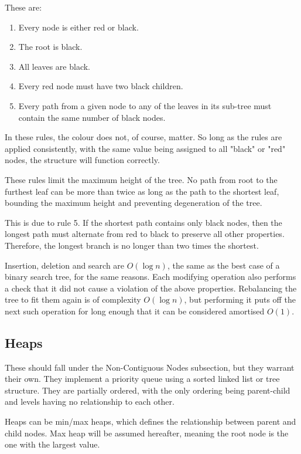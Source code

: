 \documentclass[]{article}
\begin{document}
These are:

\begin{enumerate}
	\item Every node is either red or black.
	\item The root is black.
	\item All leaves are black. 
	\item Every red node must have two black children.
	\item Every path from a given node to any of the leaves in its sub-tree must contain the same number of black nodes.
\end{enumerate}

In these rules, the colour does not, of course, matter. So long as the rules are applied consistently, with the same value being assigned to all "black" or "red" nodes, the structure will function correctly.

These rules limit the maximum height of the tree. No path from root to the furthest leaf can be more than twice as long as the path to the shortest leaf, bounding the maximum height and preventing degeneration of the tree.

This is due to rule 5. If the shortest path contains only black nodes, then the longest path must alternate from red to black to preserve all other properties. Therefore, the longest branch is no longer than two times the shortest.

Insertion, deletion and search are $O(\log{n})$, the same as the best case of a binary search tree, for the same reasons. Each modifying operation also performs a check that it did not cause a violation of the above properties. Rebalancing the tree to fit them again is of complexity $O(\log{n})$, but performing it puts off the next such operation for long enough that it can be considered amortised $O(1)$.

\pagebreak

\subsection{Heaps}

These should fall under the Non-Contiguous Nodes subsection, but they warrant their own. They implement a priority queue using a sorted linked list or tree structure. They are partially ordered, with the only ordering being parent-child and levels having no relationship to each other.

Heaps can be min/max heaps, which defines the relationship between parent and child nodes. Max heap will be assumed hereafter, meaning the root node is the one with the largest value.
\end{document}
